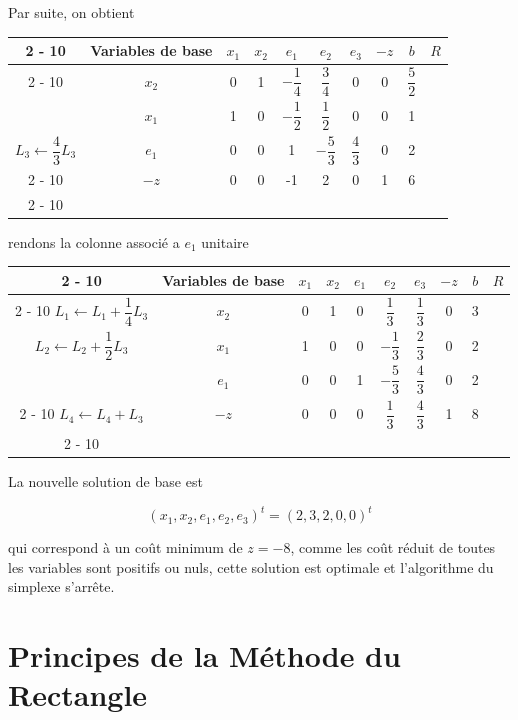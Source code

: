 \documentclass[a4paper,12pt,openany]{book}
\theoremstyle{plain}
\theoremstyle{definition}
\theoremstyle{remark}
\theoremstyle{nbstyle}
\begin{document}
	Par suite, on obtient
	
	\begin{tabular}{cc|cccccc|c|c}
		\cline { 2 - 10 }
		&Variables de base & $x_{1}$ & $x_{2}$ & $e_{1}$ & $e_{2}$ & $e_{3}$ & $-z$ & $b$ & $R$ \\
		\cline { 2 - 10 }
		& $x_{2}$&0 & 1 & $-\dfrac{1}{4}$ & $\dfrac{3}{4}$ & 0 & 0 & $\dfrac{5}{2}$& \\
		& $x_{1}$& 1 & 0 & $-\dfrac{1}{2}$ & $\dfrac{1}{2}$ & 0 & 0 & 1& \\
		$L_{3} \leftarrow \dfrac{4}{3} L_{3}$&$e_{1}$ & 0 & 0 & 1 & $-\dfrac{5}{3}$ & $\dfrac{4}{3}$ & 0 & 2 &  \\
		\cline { 2 - 10 }
		&$-z$&0 & 0 & -1 & 2 & 0 & 1 & 6& \\
		\cline { 2 - 10 }
	\end{tabular}
	
	rendons la colonne associé a $e_{1}$ unitaire
	
	\begin{center}
		\begin{tabular}{cc|cccccc|c|c}
			\cline { 2 - 10 }
			& Variables de base & $x_{1}$ & $x_{2}$ & $e_{1}$ & $e_{2}$ & $e_{3}$ & $-z$ & $b$ & $R$ \\
			\cline { 2 - 10 }
			$L_{1} \leftarrow L_{1}+\dfrac{1}{4} L_{3}$& $x_{2}$ & 0 & 1 & 0 & $\dfrac{1}{3}$ & $\dfrac{1}{3}$ & 0 & 3 &  \\
			$L_{2} \leftarrow L_{2}+\dfrac{1}{2} L_{3}$ & $x_{1}$ & 1 & 0 & 0 & $-\dfrac{1}{3}$ & $\dfrac{2}{3}$ & 0 & 2 &  \\
			& $e_{1}$ & 0 & 0 & 1 & $-\dfrac{5}{3}$ & $\dfrac{4}{3}$ & 0 & 2 &  \\
			\cline { 2 - 10 }
			$L_{4} \leftarrow L_{4}+L_{3}$& $-z$ & 0 & 0 & 0 & $\dfrac{1}{3}$ & $\dfrac{4}{3}$ & 1 & 8 &  \\
			\cline { 2 - 10 }
		\end{tabular}
	\end{center}
	
	La nouvelle solution de base est
	
	$$
	\left(x_{1}, x_{2}, e_{1}, e_{2}, e_{3}\right)^{t}=(2,3,2,0,0)^{t}
	$$
	
	qui correspond à un coût minimum de $z=-8$, comme les coût réduit de toutes les variables sont positifs ou nuls, cette solution est optimale et l'algorithme du simplexe s'arrête.
	
	\section{Principes de la Méthode du Rectangle}
	
\end{document}
